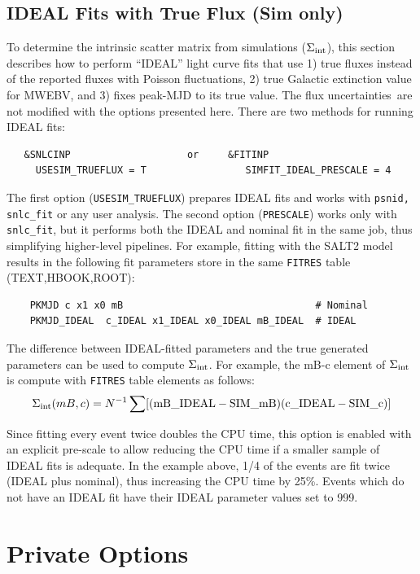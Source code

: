 \documentclass[12pt]{article}
\newcommand{\uncs}{uncertainties}
\begin{document}
\clearpage
\subsection{IDEAL Fits with True Flux (Sim only) }
\label{subsec:IDEAL}

\newcommand{\SigInt}{\Sigma_{\rm int}}

To determine the intrinsic scatter matrix from simulations ($\SigInt$),
this section describes how to perform ``IDEAL'' light curve fits that
use 
1) true fluxes instead of the reported fluxes with Poisson 
fluctuations, 
2) true Galactic extinction value for MWEBV, and
3) fixes peak-MJD to its true value.
The flux \uncs\ are not modified with the options presented here.
There are two methods for running IDEAL fits:
%
\begin{verbatim}
   &SNLCINP                    or     &FITINP
     USESIM_TRUEFLUX = T                 SIMFIT_IDEAL_PRESCALE = 4 
\end{verbatim}
%
The first option ({\tt USESIM\_TRUEFLUX}) prepares IDEAL fits
and works with {\tt psnid, snlc\_fit} or any user analysis.
The second option ({\tt PRESCALE}) works only with {\tt snlc\_fit},
but it performs both the IDEAL and nominal fit in the
same job, thus simplifying higher-level pipelines.
For example, fitting with the SALT2 model results
in the following fit parameters store in the same
{\tt FITRES} table (TEXT,HBOOK,ROOT):
\begin{verbatim}
    PKMJD c x1 x0 mB                                 # Nominal
    PKMJD_IDEAL  c_IDEAL x1_IDEAL x0_IDEAL mB_IDEAL  # IDEAL
\end{verbatim}
%

The difference between IDEAL-fitted parameters and the true generated 
parameters can be used to compute $\SigInt$. For example, 
the mB-c element of $\SigInt$ is compute with {\tt FITRES} table
elements as follows:
%
  $$ \SigInt(mB,c) = 
      N^{-1}\sum[{\rm (mB\_IDEAL-SIM\_mB)(c\_IDEAL-SIM\_c)}]
   $$

Since fitting every event twice doubles the CPU time, 
this option is enabled with an explicit pre-scale
to allow reducing the CPU time if a smaller sample
of IDEAL fits is adequate. In the example above,
1/4 of the events are fit twice (IDEAL plus nominal),
thus increasing the CPU time by 25\%. 
Events which do not have an IDEAL fit have their
IDEAL parameter values set to 999.


  \clearpage
  \section{Private Options}
  \label{sec:private}
\end{document}
